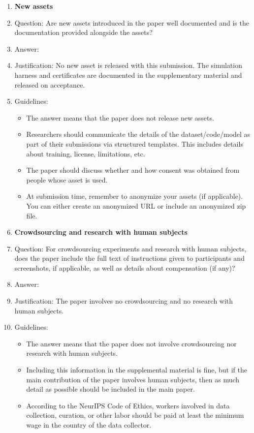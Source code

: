 \begin{enumerate}
\item {\bf New assets}
    \item[] Question: Are new assets introduced in the paper well documented and is the documentation provided alongside the assets?
    \item[] Answer: \answerNA{}
    \item[] Justification: No new asset is released with this submission. The simulation harness and certificates are documented in the supplementary material and released on acceptance.
    \item[] Guidelines:
    \begin{itemize}
        \item The answer \answerNA{} means that the paper does not release new assets.
        \item Researchers should communicate the details of the dataset\slash code\slash model as part of their submissions via structured templates. This includes details about training, license, limitations, etc. 
        \item The paper should discuss whether and how consent was obtained from people whose asset is used.
        \item At submission time, remember to anonymize your assets (if applicable). You can either create an anonymized URL or include an anonymized zip file.
    \end{itemize}

\item {\bf Crowdsourcing and research with human subjects}
    \item[] Question: For crowdsourcing experiments and research with human subjects, does the paper include the full text of instructions given to participants and screenshots, if applicable, as well as details about compensation (if any)? 
    \item[] Answer: \answerNA{}
    \item[] Justification: The paper involves no crowdsourcing and no research with human subjects.
    \item[] Guidelines:
    \begin{itemize}
        \item The answer \answerNA{} means that the paper does not involve crowdsourcing nor research with human subjects.
        \item Including this information in the supplemental material is fine, but if the main contribution of the paper involves human subjects, then as much detail as possible should be included in the main paper. 
        \item According to the NeurIPS Code of Ethics, workers involved in data collection, curation, or other labor should be paid at least the minimum wage in the country of the data collector. 
    \end{itemize}


\end{enumerate}
